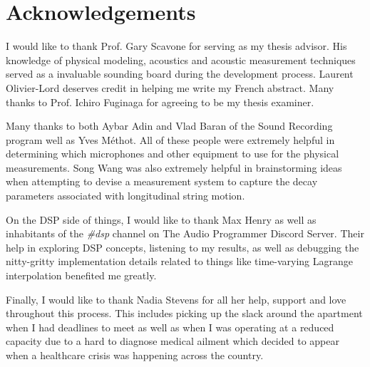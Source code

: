 \documentclass[../main.tex]{subfiles}
\begin{document}
\chapter*{Acknowledgements}
I would like to thank Prof. Gary Scavone for serving as my thesis advisor. His knowledge of physical modeling, acoustics and acoustic measurement techniques served as a invaluable sounding board during the development process. Laurent Olivier-Lord deserves credit in helping me write my French abstract. Many thanks to Prof. Ichiro Fuginaga for agreeing to be my thesis examiner. 

Many thanks to both Aybar Adin and Vlad Baran of the Sound Recording program well as Yves Méthot. All of these people were extremely helpful in determining which microphones and other equipment to use for the physical measurements. Song Wang was also extremely helpful in brainstorming ideas when attempting to devise a measurement system to capture the decay parameters associated with longitudinal string motion.

On the DSP side of things, I would like to thank Max Henry as well as inhabitants of the \emph{\#dsp} channel on The Audio Programmer Discord Server. Their help in exploring DSP concepts, listening to my results, as well as debugging the nitty-gritty implementation details related to things like time-varying Lagrange interpolation benefited me greatly.

Finally, I would like to thank Nadia Stevens for all her help, support and love throughout this process. This includes picking up the slack around the apartment when I had deadlines to meet as well as when I was operating at a reduced capacity due to a hard to diagnose medical ailment which decided to appear when a healthcare crisis was happening across the country.
\end{document}
